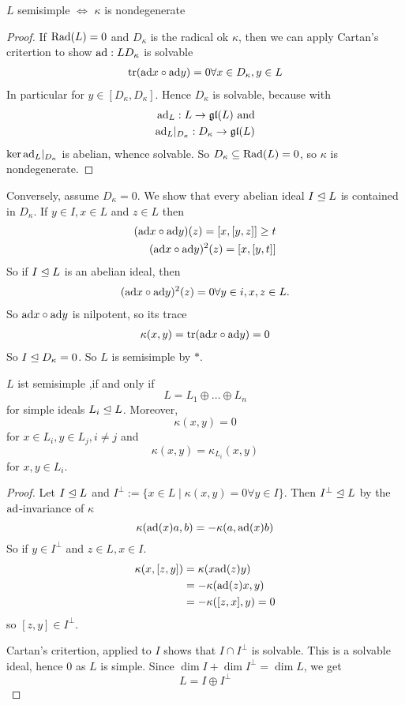 \begin{theorem}
    $L$ semisimple $\iff$ $\kappa$ is nondegenerate
\end{theorem}
\begin{proof}
    If $\text{Rad}(L) = 0$ and $D_\kappa$ is the radical ok $\kappa$, then we can apply Cartan's critertion to show
    $\text{ad}:L D_\kappa$ is solvable
    \begin{align*}
        \operatorname{tr}(\text{ad} x \circ \text{ad} y) = 0 \forall x \in D_\kappa, y \in L
    \end{align*}
    In particular for $y \in [D_\kappa, D_\kappa]$.
    Hence $D_\kappa$ is solvable, because with
    \begin{align*}
        \text{ad}_L : L \to \mathfrak{gl}(L) \text{ and}\\
        \text{ad}_L |_{D_\kappa}: D_\kappa \to \mathfrak{gl}(L)
    \end{align*}
    $\ker \text{ad}_{L}|_{D_\kappa}$ is abelian, whence solvable.
    So $D_\kappa \subseteq \text{Rad}(L) = 0$, so $\kappa$ is nondegenerate.
\end{proof}

Conversely, assume $D_\kappa = 0$. We show that every abelian ideal $I \trianglelefteq L$ is contained in $D_\kappa$.
If $y \in I, x \in L$ and $z \in L$ then
\begin{align*}
    (\text{ad} x \circ \text{ad} y)(z) = [x,[y,z]] \geq t\\
    (\text{ad} x \circ \text{ad} y)^2(z) = [x,[y,t]]
\end{align*}
So if $I \trianglelefteq L$ is an abelian ideal, then 
\begin{align*}
    (\text{ad} x \circ \text{ad} y)^2 (z) = 0 \forall y \in i, x,z \in L.
\end{align*}
So $\text{ad} x \circ \text{ad} y$ is nilpotent, so its trace
\begin{align*}
    \kappa(x,y) = \operatorname{tr}(\text{ad} x \circ \text{ad} y) = 0
\end{align*}
So $I \trianglelefteq D_\kappa = 0$. So $L$ is semisimple by $\ast$.

\begin{theorem}
    $L$ ist semisimple ,if and only if
    $$ L = L_1 \oplus \ldots \oplus L_n $$
    for simple ideals $L_i \trianglelefteq L$. Moreover, 
    $$ \kappa(x,y) = 0$$ for $x \in L_i, y \in L_j, i \neq j$ and
    $$ \kappa(x,y) = \kappa_{L_i}(x,y)$$ for $x,y \in L_i$.
\end{theorem}
\begin{proof}
    Let $I \trianglelefteq L$ and $I^{\bot} := \{x \in L \mid \kappa(x,y) = 0 \forall y \in I\}$. 
    Then $I^\bot \trianglelefteq L$ by the $\text{ad}$-invariance of $\kappa$
    $$ \kappa(\text{ad}(x)a, b) = - \kappa(a, \text{ad}(x)b)$$
    So if $y \in I^\bot$ and $z \in L, x \in I$.
    \begin{align*}
        \kappa(x, [z,y]) &= \kappa(x \text{ad} (z) y)\\
        &= - \kappa(\text{ad}(z)x,y)\\
        &= - \kappa([z,x],y) = 0
    \end{align*}
    so $[z,y] \in I^\bot$.

    Cartan's critertion, applied to $I$ shows that $I \cap I^\bot$ is solvable.
    This is a solvable ideal, hence $0$ as $L$ is simple.
    Since $\dim I + \dim I^\bot = \dim L$, we get
    $$ L = I \oplus I^\bot$$
\end{proof}
